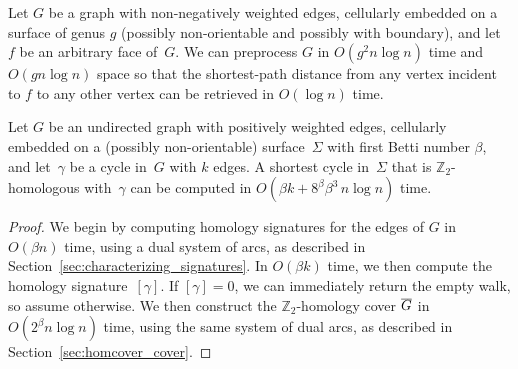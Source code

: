 \documentclass[letterpaper,review]{siamart190516}
\def\Z{\mathbb{Z}}
\def\cycle{\gamma}
\def\Gbar{\overline{\smash{G}\vphantom{t}}}
\def\modified#1{\color{blue}#1 \color{black}}
\begin{document}
{\begin{lemma}
\label{lem:multishort}
Let $G$ be a graph with non-negatively weighted edges, cellularly embedded on a surface of genus $g$ (possibly non-orientable and possibly with boundary), and let $f$ be an arbitrary face of~$G$.
We can preprocess $G$ in $O(g^2 n\log n)$ time and $O(g n \log n)$ space so that the shortest-path distance from any vertex incident to $f$ to any other vertex can be retrieved in $O(\log n)$ time.
\end{lemma}
%

\begin{theorem}
\label{thm:min-cycle}
Let $G$ be an undirected graph with positively weighted edges, cellularly embedded on a (possibly non-orientable) surface~$\Sigma$ with first Betti number $\beta$, and let~$\cycle$ be a cycle in~$G$ with $k$ edges.  A shortest cycle in~$\Sigma$ that is $\Z_2$-homologous with~$\cycle$ can be computed in $O(\beta k + 8^\beta \beta^3\, n\log n)$ time.
\end{theorem}

\begin{proof}
We begin by computing homology signatures for the edges of $G$ in $O(\beta n)$ time, using a dual system of arcs, as described in Section~\ref{sec:characterizing_signatures}.  In $O(\beta k)$ time, we then compute the homology signature~$[\cycle]$.  If $[\cycle] = 0$, we can immediately return the empty walk, so assume otherwise.  We then construct the $\Z_2$-homology cover $\Gbar$ in $O(2^\beta n\log n)$ time, using the same system of dual arcs, as described in Section~\ref{sec:homcover_cover}.


\end{proof}}
\end{document}
